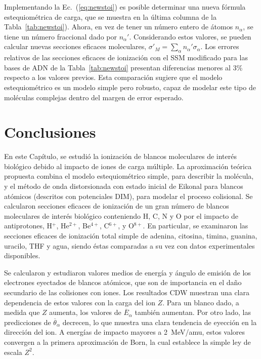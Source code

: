 Implementando la Ec.~(\ref{eq:newstoi}) es posible determinar una nueva 
fórmula estequiométrica de carga, que se muestra en la última columna de 
la Tabla~\ref{tab:newstoi}). Ahora, en vez de tener un número entero de 
átomos $n_{\alpha}$, se tiene un número fraccional dado por 
$n_{\alpha}'$. Considerando estos valores, se pueden calcular nuevas 
secciones eficaces moleculares, 
$\sigma'_{M}=\sum_{\alpha}n_{\alpha}'\sigma_{\alpha}$. Los errores 
relativos de las secciones eficaces de ionización con el SSM modificado 
para las bases de ADN de la Tabla~\ref{tab:newstoi} presentan 
diferencias menores al 3\% respecto a los valores previos. Esta 
comparación sugiere que el modelo estequiométrico es un modelo simple 
pero robusto, capaz de modelar este tipo de moléculas complejas dentro 
del margen de error esperado.

\section{Conclusiones}

En este Capítulo, se estudió la ionización de blancos moleculares de 
interés biológico debido al impacto de iones de carga múltiple. La 
aproximación teórica propuesta combina el modelo estequiométrico simple, 
para describir la molécula, y el método de onda distorsionada con estado 
inicial de Eikonal para blancos atómicos (descritos con potenciales 
DIM), para modelar el proceso colisional. Se calcularon secciones 
eficaces de ionización de un gran número de blancos moleculares de 
interés biológico conteniendo H, C, N y O por el impacto de 
antiprotones, H$^{+}$, He$^{2+}$, Be$^{4+}$, C$^{6+}$, y O$^{8+}$. 
En particular, se examinaron las secciones eficaces de ionización total 
simple de adenina, citosina, timina, guanina, uracilo, THF y agua, 
siendo éstas comparadas a su vez con datos experimentales disponibles. 

Se calcularon y estudiaron valores medios de energía y ángulo de emisión 
de los electrones eyectados de blancos atómicos, que son de importancia 
en el daño secundario de las colisiones con iones. Los resultados CDW
muestran una clara dependencia de estos valores con la carga del ion 
$Z$. Para un blanco dado, a medida que $Z$ aumenta, los valores de
$\overline{E}_{\alpha}$ también aumentan. Por otro lado, las 
predicciones de $\overline{\theta}_{\alpha}$ decrecen, lo que muestra 
una clara tendencia de eyección en la dirección del ion. A energías de 
impacto mayores a 2~MeV/amu, estos valores convergen a la primera 
aproximación de Born, la cual establece la simple ley de escala $Z^{2}$. 

